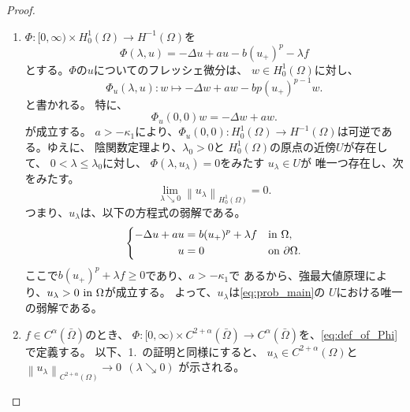 \begin{proof}
 \begin{enumerate}[1.] \sage
  \item $\Phi \colon [0,\infty) \times H^1_0 (\Omega) \to H^{-1}(\Omega)$を
        \begin{equation}
         \Phi (\lambda, u) = -\Delta u + au - b (u_{+})^p - \lambda f
          \label{eq:def_of_Phi}
        \end{equation}
        とする。$\Phi$の$u$についてのフレッシェ微分は、
        $w \in H^1_0(\Omega)$に対し、
        \begin{equation}
         \Phi_u (\lambda, u) \colon w \mapsto -\Delta w + aw - b
          p(u_+)^{p-1} w.
          \label{eq:Phi_dr}
        \end{equation}
        と書かれる。
        特に、
        \[
         \Phi_u (0, 0) w = -\Delta w + aw.
        \]
        が成立する。
        $a > -\kappa_1$により、$\Phi_u(0,0) \colon
        H^1_0(\Omega) \to H^{-1} (\Omega)$は可逆である。ゆえに、
        陰関数定理より、$\lambda_0 > 0$と
        $H_0^1(\Omega)$の原点の近傍$U$が存在して、
        $0 < \lambda \leq \lambda_0$に対し、
        $\Phi(\lambda, u_\lambda) = 0$をみたす
        $u_\lambda \in U$が
        唯一つ存在し、次をみたす。
        \[\lim_{\lambda \searrow 0} \left\| u_\lambda
        \right\|_{H^1_0(\Omega)} 
        = 0. \]
        つまり、$u_\lambda$は、以下の方程式の弱解である。
        \begin{align}
         \left\{
         \begin{aligned}
          -\Delta u + a u &= b (u_+)^p + \lambda f  & &\text{in}~ \Omega,  \\
          u &= 0 & &\text{on}~ \partial\Omega.
         \end{aligned}
         \right. \label{eq:prob_lem_ifthm}
        \end{align}
        ここで$b (u_+)^p + \lambda f \geq 0$であり、$a > -\kappa_1$で
        あるから、強最大値原理により、$u_\lambda > 0 ~\text{in}~
        \Omega$が成立する。
        よって、$u_\lambda$は\ref{eq:prob_main}の
        $U$における唯一の弱解である。
  \item $f \in C^\alpha(\bar{\Omega})$のとき、
        $\Phi \colon [0,\infty) \times C^{2+\alpha} (\bar{\Omega})
        \to C^\alpha(\bar{\Omega})$を、\eqref{eq:def_of_Phi}で定義する。
        以下、1.~の証明と同様にすると、
        $u_\lambda \in
        C^{2+\alpha}(\Omega)$と
        $\left\| u_\lambda
        \right\|_{C^{2+\alpha}(\Omega)} \to 0 \ \ (\lambda \searrow
        0)$
        が示される。\qedhere
 \end{enumerate}
\end{proof}

